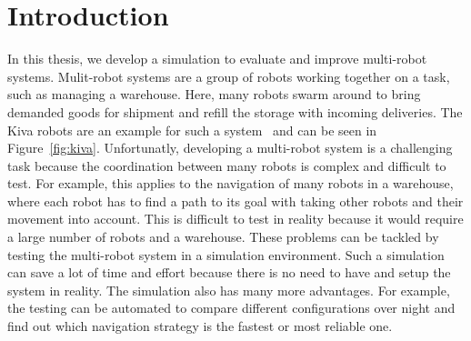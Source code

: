 \chapter{Introduction}

In this thesis, we develop a simulation to evaluate and improve multi-robot systems. Mulit-robot systems are a group of robots working together on a task, such as managing a warehouse. Here, many robots swarm around to bring demanded goods for shipment and refill the storage with incoming deliveries. The Kiva robots are an example for such a system~\cite{Kiva} and can be seen in Figure~\ref{fig:kiva}. Unfortunatly, developing a multi-robot system is a challenging task because the coordination between many robots is complex and difficult to test. For example, this applies to the navigation of many robots in a warehouse, where each robot has to find a path to its goal with taking other robots and their movement into account. This is difficult to test in reality because it would require a large number of robots and a warehouse. These problems can be tackled by testing the multi-robot system in a simulation environment. Such a simulation can save a lot of time and effort because there is no need to have and setup the system in reality. The simulation also has many more advantages. For example, the testing can be automated to compare different configurations over night and find out which navigation strategy is the fastest or most reliable one.\\
